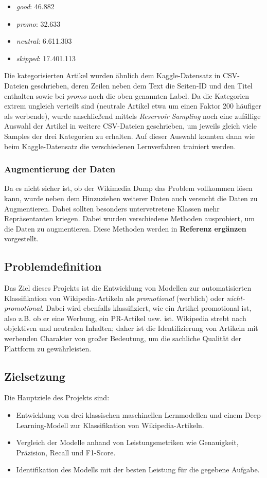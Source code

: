 \begin{itemize}
    \item \emph{good}: 46.882
    \item \emph{promo}: 32.633
    \item \emph{neutral}: 6.611.303
    \item \emph{skipped}: 17.401.113
\end{itemize}
Die kategorisierten Artikel wurden ähnlich dem Kaggle-Datensatz in CSV-Dateien geschrieben, deren Zeilen neben dem Text die Seiten-ID und den Titel enthalten sowie bei \emph{promo} noch die oben genannten Label. Da die Kategorien extrem ungleich verteilt sind (neutrale Artikel etwa um einen Faktor 200 häufiger als werbende), wurde anschließend mittels \textit{Reservoir Sampling} noch eine zufällige Auswahl der Artikel in weitere CSV-Dateien geschrieben, um jeweils gleich viele Samples der drei Kategorien zu erhalten. Auf dieser Auswahl konnten dann wie beim Kaggle-Datensatz die verschiedenen Lernverfahren trainiert werden.

\subsubsection{Augmentierung der Daten}
Da es nicht sicher ist, ob der Wikimedia Dump das Problem vollkommen lösen kann, wurde neben dem Hinzuziehen weiterer Daten auch versucht die Daten zu Augmentieren. Dabei sollten besonders untervetretene Klassen mehr Repräsentanten kriegen. Dabei wurden verschiedene Methoden ausprobiert, um die Daten zu augmentieren. Diese Methoden werden in \textbf{Referenz ergänzen} vorgestellt.

\subsection{Problemdefinition}
Das Ziel dieses Projekts ist die Entwicklung von Modellen zur automatisierten Klassifikation von Wikipedia-Artikeln als \emph{promotional} (werblich) oder \emph{nicht-promotional}. Dabei wird ebenfalls klassifiziert, wie ein Artikel promotional ist, also z.B. ob er eine Werbung, ein PR-Artikel usw. ist. Wikipedia strebt nach objektiven und neutralen Inhalten; daher ist die Identifizierung von Artikeln mit werbenden Charakter von großer Bedeutung, um die sachliche Qualität der Plattform zu gewährleisten.

\subsection{Zielsetzung}

Die Hauptziele des Projekts sind:

\begin{itemize} \item Entwicklung von drei klassischen maschinellen Lernmodellen und einem Deep-Learning-Modell zur Klassifikation von Wikipedia-Artikeln. \item Vergleich der Modelle anhand von Leistungsmetriken wie Genauigkeit, Präzision, Recall und F1-Score. \item Identifikation des Modells mit der besten Leistung für die gegebene Aufgabe. \end{itemize}